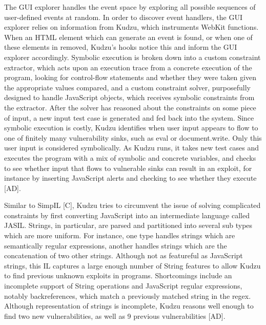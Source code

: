 \documentclass[11pt,expanded,copyright]{fsuthesis}
\begin{document}
The GUI explorer handles the event space by exploring all possible sequences of user-defined events at random. In order to discover event handlers, the GUI explorer relies on information from Kudzu, which instruments WebKit functions. When an HTML element which can generate an event is found, or when one of these elements in removed, Kudzu's hooks notice this and inform the GUI explorer accordingly. Symbolic execution is broken down into a custom constraint extractor, which acts upon an execution trace from a concrete execution of the program, looking for control-flow statements and whether they were taken given the appropriate values compared, and a custom constraint solver, purposefully designed to handle JavaScript objects, which receives symbolic constraints from the extractor. After the solver has reasoned about the constraints on some piece of input, a new input test case is generated and fed back into the system. Since symbolic execution is costly, Kudzu identifies when user input appears to flow to one of finitely many vulnerability sinks, such as eval or document.write. Only this user input is considered symbolically. As Kudzu runs, it takes new test cases and executes the program with a mix of symbolic and concrete variables, and checks to see whether input that flows to vulnerable sinks can result in an exploit, for instance by inserting JavaScript alerts and checking to see whether they execute [AD].

Similar to SimpIL [C], Kudzu tries to circumvent the issue of solving complicated constraints by first converting JavaScript into an intermediate language called JASIL. Strings, in particular, are parsed and partitioned into several sub types which are more uniform. For instance, one type handles strings which are semantically regular expressions, another handles strings which are the concatenation of two other strings. Although not as featureful as JavaScript strings, this IL captures a large enough number of String features to allow Kudzu to find previous unknown exploits in programs. Shortcomings include an incomplete support of String operations and JavaScript regular expressions, notably backreferences, which match a previously matched string in the regex. Although representation of strings is incomplete, Kudzu reasons well enough to find two new vulnerabilities, as well as 9 previous vulnerabilities [AD].

\end{document}
